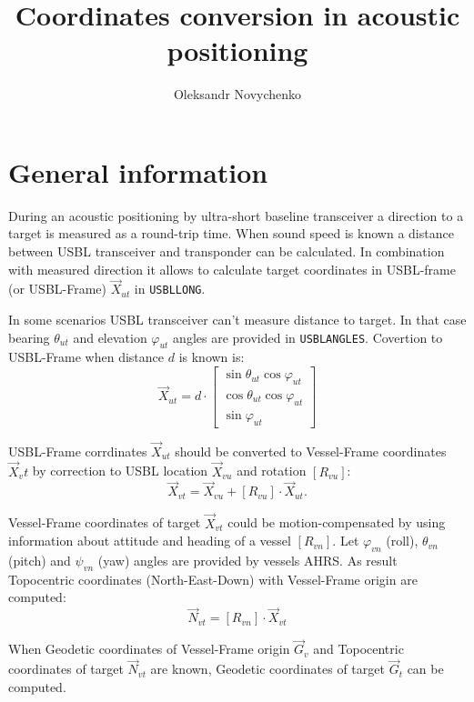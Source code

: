 \documentclass[10pt,letterpaper]{article}
\title{Coordinates conversion in acoustic positioning}
\author{Oleksandr Novychenko}
\numberwithin{equation}{section}
\numberwithin{figure}{section}
\numberwithin{table}{section}
\begin{document}
\maketitle

\section{General information}
During an acoustic positioning by ultra-short baseline transceiver a direction to a
target is measured as a round-trip time. When sound speed is known a distance between
USBL transceiver and transponder can be calculated. In combination with measured direction
it allows to calculate target coordinates in USBL-frame (or USBL-Frame) $\vec{X}_{ut}$
in \texttt{USBLLONG}.

In some scenarios USBL transceiver can't measure distance to target. In that case bearing
$\theta_{ut}$ and elevation $\varphi_{ut}$ angles are provided in \texttt{USBLANGLES}.
Covertion to USBL-Frame when distance $d$ is known is:
\begin{equation}
    \vec{X}_{ut} = d \cdot \begin{bmatrix}
        \sin \theta_{ut} \cos \varphi_{ut} \\
        \cos \theta_{ut} \cos \varphi_{ut} \\
        \sin \varphi_{ut}
    \end{bmatrix}
\end{equation}

USBL-Frame corrdinates $\vec{X}_{ut}$ should be converted to Vessel-Frame coordinates
$\vec{X}_vt$ by correction to USBL location $\vec{X}_{vu}$ and rotation $[R_{vu}]$:
\begin{equation}
    \vec{X}_{vt} = \vec{X}_{vu} + [R_{vu}] \cdot \vec{X}_{ut}.
    \label{equ:lf2vf}
\end{equation}

Vessel-Frame coordinates of target $\vec{X}_{vt}$ could be motion-compensated by using
information about attitude and heading of a vessel $[R_{vn}]$. Let $\varphi_{vn}$ (roll), $\theta_{vn}$
(pitch) and $\psi_{vn}$ (yaw) angles are provided by vessels AHRS. As result Topocentric
coordinates (North-East-Down) with Vessel-Frame origin are computed:
\begin{equation}
    \vec{N}_{vt} = [R_{vn}] \cdot \vec{X}_{vt}
    \label{equ:vf2ned}
\end{equation}

When Geodetic coordinates of Vessel-Frame origin $\vec{G}_{v}$ and Topocentric coordinates
of target $\vec{N}_{vt}$ are known, Geodetic coordinates of target $\vec{G}_{t}$ can be
computed.
\end{document}
